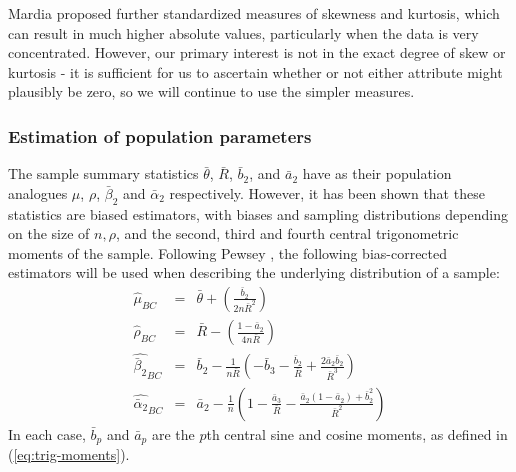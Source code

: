 \documentclass[../../ArchStats.tex]{subfiles}
\begin{document}
Mardia \cite{Mardia1972} proposed further standardized measures of skewness and kurtosis, which can result in much higher absolute values, particularly when the data is very concentrated. However, our primary interest is not in the exact degree of skew or kurtosis - it is sufficient for us to ascertain whether or not either attribute might plausibly be zero, so we will continue to use the simpler measures.

\subsubsection{Estimation of population parameters}
\label{sec:bias-corrected}
The sample summary statistics $\bar{\theta}$, $\bar{R}$, $\bar{b}_2$, and $\bar{a}_2$ have as their population analogues $\mu$, $\rho$, $\bar{\beta}_2$ and $\bar{\alpha}_2$ respectively. However, it has been shown \cite{Pewsey2004} that these statistics  are biased estimators, with biases and sampling distributions depending on the size of $n, \rho$, and the second, third and fourth central trigonometric moments of the sample. Following Pewsey \cite{Pewsey2014}, the following bias-corrected estimators will be used when describing the underlying distribution of a sample:
	\begin{eqnarray}
	\hat{\mu}_{BC} &=& \bar{\theta} + \left(\frac{\bar{b}_2}{2n\bar{R}^2} \right)\\[5pt]
	\hat{\rho}_{BC} &=& \bar{R} - \left(\frac{1-\bar{a}_2}{4n\bar{R}}\right)\\[5pt]
	\widehat{\bar{\beta}_2}_{BC} &=& \bar{b}_2 - \frac{1}{n\bar{R}} \left(-\bar{b}_3 - \frac{\bar{b}_2}{\bar{R}} + \frac{2\bar{a}_2\bar{b}_2}{\bar{R}^3}\right)\\[5pt]
	\widehat{\bar{\alpha}_2}_{BC} &=& \bar{a}_2 - \frac{1}{n} \left(1-\frac{\bar{a}_3}{\bar{R}}-\frac{\bar{a}_2(1-\bar{a}_2) + \bar{b}_2^2}{\bar{R}^2}\right)
	\end{eqnarray}
In each case, $\bar{b}_p$ and $\bar{a}_p$ are the $p$th central sine and cosine moments, as defined in (\ref{eq:trig-moments}).
\end{document}
